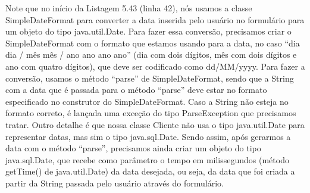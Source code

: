  
 


 
Note que no início da Listagem 5.43 (linha 42), nós usamos a classe SimpleDateFormat para converter a data inserida pelo usuário no formulário para um objeto do tipo java.util.Date. Para fazer essa conversão, precisamos criar o SimpleDateFormat com o formato que estamos usando para a data, no caso ``dia dia / mês mês / ano ano ano ano'' (dia com dois dígitos, mês com dois dígitos e ano com quatro dígitos), que deve ser codificado como dd/MM/yyyy.  Para fazer a conversão, usamos o método ``parse'' de SimpleDateFormat, sendo que a String com a data que é passada para o método ``parse'' deve estar no formato especificado no construtor do SimpleDateFormat. Caso a String não esteja no formato correto, é lançada uma exceção do tipo ParseException que precisamos tratar.
Outro detalhe é que nossa classe Cliente não usa o tipo java.util.Date para representar datas, mas sim o tipo java.sql.Date. Sendo assim, após gerarmos a data com o método ``parse'', precisamos ainda criar um objeto do tipo java.sql.Date, que recebe como parâmetro o tempo em milissegundos (método getTime() de java.util.Date) da data desejada, ou seja, da data que foi criada a partir da String passada pelo usuário através do formulário.


